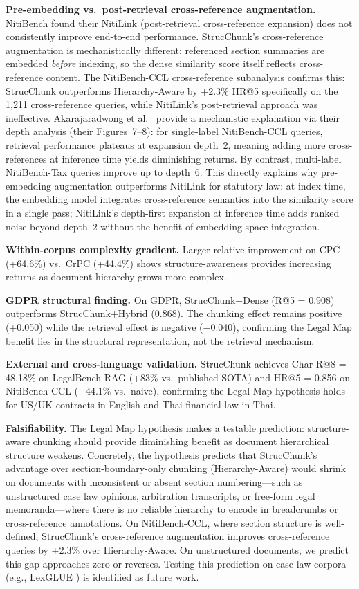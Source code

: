 \documentclass[sn-mathphys,Numbered]{sn-jnl}%
\begin{document}
\textbf{Pre-embedding vs.\ post-retrieval cross-reference augmentation.}
NitiBench found their NitiLink (post-retrieval cross-reference expansion)
does not consistently improve end-to-end performance.  StrucChunk's
cross-reference augmentation is mechanistically different: referenced
section summaries are embedded \emph{before} indexing, so the dense
similarity score itself reflects cross-reference content.  The NitiBench-CCL
cross-reference subanalysis confirms this: StrucChunk outperforms
Hierarchy-Aware by +2.3\% HR@5 specifically on the 1,211 cross-reference
queries, while NitiLink's post-retrieval approach was ineffective.
Akarajaradwong et al.~\cite{akarajaradwong2025nitibenchcomprehensivestudyllm} provide a mechanistic explanation via
their depth analysis (their Figures~7--8): for single-label NitiBench-CCL
queries, retrieval performance plateaus at expansion depth~2, meaning
adding more cross-references at inference time yields diminishing returns.
By contrast, multi-label NitiBench-Tax queries improve up to depth~6.
This directly explains why pre-embedding augmentation outperforms
NitiLink for statutory law: at index time, the embedding model integrates
cross-reference semantics into the similarity score in a single pass;
NitiLink's depth-first expansion at inference time adds ranked noise beyond
depth~2 without the benefit of embedding-space integration.

\textbf{Within-corpus complexity gradient.}  Larger relative improvement
on CPC (+64.6\%) vs.\ CrPC (+44.4\%) shows structure-awareness provides
increasing returns as document hierarchy grows more complex.

\textbf{GDPR structural finding.}  On GDPR, StrucChunk+Dense
(R@5 = 0.908) outperforms StrucChunk+Hybrid (0.868).  The chunking effect
remains positive (+0.050) while the retrieval effect is negative
($-$0.040), confirming the Legal Map benefit lies in the structural
representation, not the retrieval mechanism.

\textbf{External and cross-language validation.}  StrucChunk achieves
Char-R@8 = 48.18\% on LegalBench-RAG (+83\% vs.\ published SOTA) and
HR@5 = 0.856 on NitiBench-CCL (+44.1\% vs.\ naive), confirming the Legal
Map hypothesis holds for US/UK contracts in English and Thai financial law
in Thai.

\textbf{Falsifiability.}  The Legal Map hypothesis makes a testable
prediction: structure-aware chunking should provide diminishing benefit as
document hierarchical structure weakens.  Concretely, the hypothesis
predicts that StrucChunk's advantage over section-boundary-only chunking
(Hierarchy-Aware) would shrink on documents with inconsistent or absent
section numbering---such as unstructured case law opinions, arbitration
transcripts, or free-form legal memoranda---where there is no reliable
hierarchy to encode in breadcrumbs or cross-reference annotations.  On
NitiBench-CCL, where section structure is well-defined, StrucChunk's
cross-reference augmentation improves cross-reference queries by +2.3\%
over Hierarchy-Aware.  On unstructured documents, we predict this gap
approaches zero or reverses.  Testing this prediction on case law corpora
(e.g., LexGLUE \cite{chalkidis-etal-2020-legal}) is identified as future
work.
\end{document}
